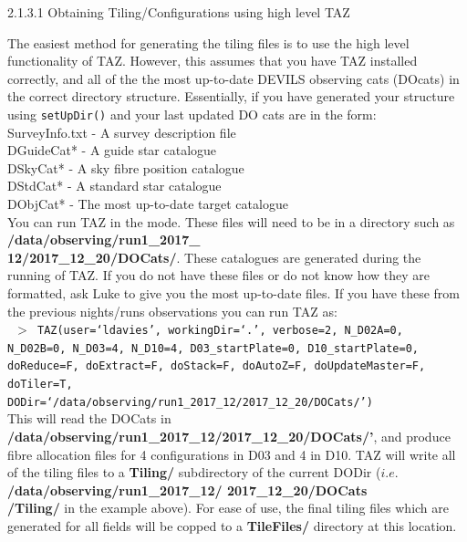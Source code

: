 \documentclass[12pt]{article}
\begin{document}
\textsf{2.1.3.1 Obtaining Tiling/Configurations using high level TAZ}

The easiest method for generating the tiling files is to use the high level functionality of TAZ. However, this assumes that you have TAZ installed correctly, and all of the the most up-to-date DEVILS observing cats (DOcats) in the correct directory structure. Essentially, if you have generated your structure using \texttt{setUpDir()} and your last updated DO cats are in the form: \\

SurveyInfo.txt - A survey description file \\
DGuideCat* - A guide star catalogue \\
DSkyCat* - A sky fibre position catalogue \\
DStdCat* - A standard star catalogue \\
DObjCat* - The most up-to-date target catalogue \\

You can run TAZ in the mode. These files will need to be in a directory such as \textbf{/data/observing/run1\_2017\_ \\ 12/2017\_12\_20/DOCats/}. These catalogues are generated during the running of TAZ. If you do not have these files or do not know how they are formatted, ask Luke to give you the most up-to-date files. If you have these from the previous nights/runs observations you can run TAZ as: \\

\texttt{ $>$ TAZ(user=`ldavies', workingDir=`.', verbose=2, N\_D02A=0, N\_D02B=0, N\_D03=4, N\_D10=4, D03\_startPlate=0, D10\_startPlate=0, doReduce=F, doExtract=F, 
doStack=F, doAutoZ=F, doUpdateMaster=F, doTiler=T, \\
DODir=`/data/observing/run1\_2017\_12/2017\_12\_20/DOCats/')} \\

This will read the DOCats in \textbf{/data/observing/run1\_2017\_12/2017\_12\_20/DOCats/'}, and produce fibre allocation files for 4 configurations in D03 and 4 in D10. TAZ will write all of the tiling files to a \textbf{Tiling/} subdirectory of the current DODir ($i.e.$ \textbf{/data/observing/run1\_2017\_12/ 2017\_12\_20/DOCats \\ /Tiling/} in the example above). For ease of use, the final tiling files which are generated for all fields will be copped to a  \textbf{TileFiles/} directory at this location. \\
\end{document}
